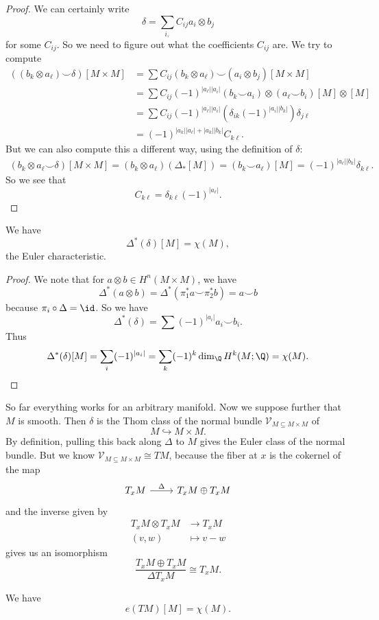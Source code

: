 \documentclass[a4paper]{article}
\theoremstyle{definition}
\begin{document}
\begin{proof}
  We can certainly write
  \[
    \delta = \sum_{i, } C_{ij} a_i \otimes b_j
  \]
  for some $C_{ij}$. So we need to figure out what the coefficients $C_{ij}$ are. We try to compute
  \begin{align*}
    ((b_k \otimes a_\ell) \smile \delta)[M \times M] &= \sum C_{ij} (b_k \otimes a_\ell) \smile (a_i \otimes b_j) [M \times M]\\
    &= \sum C_{ij} (-1)^{|a_\ell||a_i|} (b_k \smile a_i) \otimes (a_\ell \smile b_i) [M] \otimes [M]\\
    &= \sum C_{ij} (-1)^{|a_\ell||a_i|} (\delta_{ik}(-1)^{|a_i||b_k|}) \delta_{j \ell}\\
    &= (-1)^{|a_k||a_\ell| + |a_k| |b_k|} C_{k\ell}.
  \end{align*}
  But we can also compute this a different way, using the definition of $\delta$:
  \begin{align*}
    (b_k \otimes a_\ell \smile \delta)[M \times M] = (b_k \otimes a_\ell)(\Delta_*[M]) = (b_k \smile a_\ell)[M] = (-1)^{|a_\ell||b_k|} \delta_{k\ell}.
  \end{align*}
  So we see that
  \[
    C_{k\ell} = \delta_{k\ell}(-1)^{|a_\ell|}.
  \]
\end{proof}

\begin{cor}
  We have
  \[
    \Delta^*(\delta)[M] = \chi(M),
  \]
  the Euler characteristic.
\end{cor}

\begin{proof}
  We note that for $a \otimes b \in H^n(M \times M)$, we have
  \[
    \Delta^*(a \otimes b) = \Delta^*(\pi_1^* a \smile \pi_2^* b) = a \smile b
  \]
  because $\pi_i \circ \Delta = \id$. So we have
  \[
    \Delta^*(\delta) = \sum (-1)^{|a_i|} a_i \smile b_i.
  \]
  Thus
  \[
    \Delta^*(\delta)[M] = \sum_i (-1)^{|a_i|} = \sum_k (-1)^k \dim_\Q H^k(M; \Q) = \chi(M).
  \]
\end{proof}

So far everything works for an arbitrary manifold. Now we suppose further that $M$ is smooth. Then $\delta$ is the Thom class of the normal bundle $\mathcal{V}_{M \subseteq M \times M}$ of
\[
  M \hookrightarrow M \times M.
\]
By definition, pulling this back along $\Delta$ to $M$ gives the Euler class of the normal bundle. But we know $\mathcal{V}_{M \subseteq M \times M} \cong TM$, because the fiber at $x$ is the cokernel of the map
\[
  \begin{tikzcd}
    T_x M \ar[r, "\Delta"] & T_x M \oplus T_x M
  \end{tikzcd}
\]
and the inverse given by
\begin{align*}
  T_x M \otimes T_x M &\to T_x M\\
  (v, w) &\mapsto v - w
\end{align*}
gives us an isomorphism
\[
  \frac{T_x M \oplus T_x M}{\Delta T_x M} \cong T_x M.
\]
\begin{cor}
  We have
  \[
    e(TM)[M] = \chi(M).
  \]
\end{cor}
\end{document}
